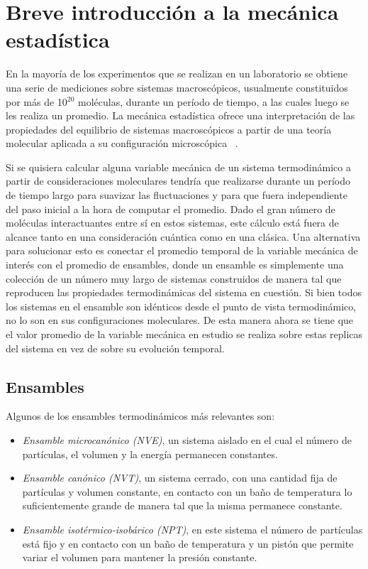 \section{Breve introducción a la mecánica estadística}

En la mayoría de los experimentos que se realizan en un laboratorio se obtiene 
una serie de mediciones sobre sistemas macroscópicos, usualmente constituidos por 
más de 10$^{20}$ moléculas, durante un período de tiempo, a las cuales luego se 
les realiza un promedio. La mecánica estadística ofrece una interpretación de 
las propiedades del equilibrio de sistemas macroscópicos a partir de una teoría 
molecular aplicada a su configuración microscópica ~\cite{hill1986}.

Si se quisiera calcular alguna variable mecánica de un sistema termodinámico a
partir de consideraciones moleculares tendría que realizarse durante un período
de tiempo largo para suavizar las fluctuaciones y para que fuera independiente
del paso inicial a la hora de computar el promedio. Dado el gran número de 
moléculas interactuantes entre sí en estos sistemas, este cálculo está fuera de
alcance tanto en una consideración cuántica como en una clásica. Una alternativa
para solucionar esto es conectar el promedio temporal de la variable mecánica de
interés con el promedio de ensambles, donde un ensamble es simplemente una 
colección de un número muy largo de sistemas construidos de manera tal que 
reproducen las propiedades termodinámicas del sistema en cuestión. Si bien todos
los sistemas en el ensamble son idénticos desde el punto de vista termodinámico,
no lo son en sus configuraciones moleculares. De esta manera ahora se tiene
que el valor promedio de la variable mecánica en estudio se realiza sobre estas 
replicas del sistema en vez de sobre su evolución temporal.

\subsection{Ensambles}

Algunos de los ensambles termodinámicos más relevantes son:
\begin{itemize}
    \item \textit{Ensamble microcanónico (NVE)}, un sistema aislado en el cual el 
        número de partículas, el volumen y la energía permanecen constantes.
    \item \textit{Ensamble canónico (NVT)}, un sistema cerrado, con una cantidad
        fija de partículas y volumen constante, en contacto con un baño de 
        temperatura lo suficientemente grande de manera tal que la misma permanece 
        constante.
    \item \textit{Ensamble isotérmico-isobárico (NPT)}, en este sistema el número
        de partículas está fijo y en contacto con un baño de temperatura y un
        pistón que permite variar el volumen para mantener la presión constante.
\end{itemize}


